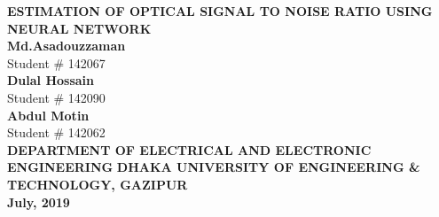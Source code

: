 \documentclass[12pt]{report}
\begin{document}
	\begin{titlepage}
		\begin{center}
			\LARGE {\bfseries {ESTIMATION OF OPTICAL SIGNAL TO NOISE RATIO USING NEURAL NETWORK}}\\
			\vspace{6cm}
			{\normalsize 
				\textbf{Md.Asadouzzaman}\\
				Student \# 142067\\
				\textbf{Dulal Hossain}\\
				Student \# 142090\\
				\textbf{Abdul Motin}\\
				Student \# 142062\\}
			\vspace{9cm}
			{\fontsize{12}{0} \bfseries {DEPARTMENT OF ELECTRICAL AND ELECTRONIC ENGINEERING}}
			{\fontsize{13}{0} \bfseries {DHAKA UNIVERSITY OF ENGINEERING \& TECHNOLOGY, GAZIPUR}}\\
			{\fontsize{12}{0} \textbf{July, 2019}}
		\end{center}
	\end{titlepage}
\end{document}

